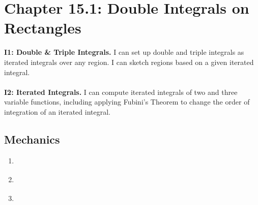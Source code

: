 
\fancyhead[R]{\dayfifteen}

\section*{\centering Chapter 15.1: Double Integrals on Rectangles}
\textbf{I1: Double \& Triple Integrals.} I can set up double and triple integrals as iterated integrals over any region. I can sketch regions based on a given iterated integral.\\\\
\textbf{I2: Iterated Integrals.} I can compute iterated integrals of two and three variable functions, including applying Fubini's Theorem to change the order of integration of an iterated integral.

\subsection*{Mechanics}
\begin{enumerate}
    \item {}
    {%
    } 
    \item {}
    {%
    } 
    \item {}
    {%
    } 
\end{enumerate}
